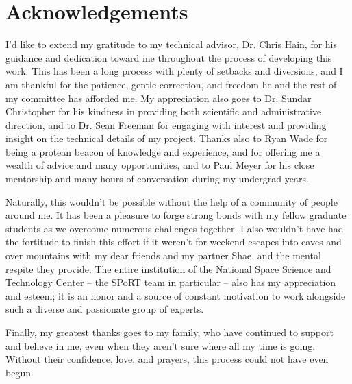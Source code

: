 \chapter{Acknowledgements}
\doublespacing

I'd like to extend my gratitude to my technical advisor, Dr. Chris Hain, for his guidance and dedication toward me throughout the process of developing this work. This has been a long process with plenty of setbacks and diversions, and I am thankful for the patience, gentle correction, and freedom he and the rest of my committee has afforded me. My appreciation also goes to Dr. Sundar Christopher for his kindness in providing both scientific and administrative direction, and to Dr. Sean Freeman for engaging with interest and providing insight on the technical details of my project. Thanks also to Ryan Wade for being a protean beacon of knowledge and experience, and for offering me a wealth of advice and many opportunities, and to Paul Meyer for his close mentorship and many hours of conversation during my undergrad years.

Naturally, this wouldn't be possible without the help of a community of people around me. It has been a pleasure to forge strong bonds with my fellow graduate students as we overcome numerous challenges together. I also wouldn't have had the fortitude to finish this effort if it weren't for weekend escapes into caves and over mountains with my dear friends and my partner Shae, and the mental respite they provide. The entire institution of the National Space Science and Technology Center -- the SPoRT team in particular -- also has my appreciation and esteem; it is an honor and a source of constant motivation to work alongside such a diverse and passionate group of experts.

Finally, my greatest thanks goes to my family, who have continued to support and believe in me, even when they aren't sure where all my time is going. Without their confidence, love, and prayers, this process could not have even begun.
